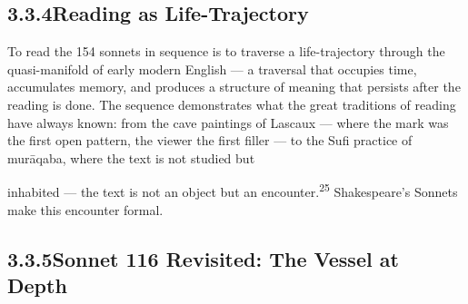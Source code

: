 \subsection{3.3.4\quad Reading as Life-Trajectory}

To read the 154 sonnets in sequence is to traverse a life-trajectory through the quasi-manifold of early modern English — a traversal that occupies time, accumulates memory, and produces a structure of meaning that persists after the reading is done. The sequence demonstrates what the great traditions of reading have always known: from the cave paintings of Lascaux — where the mark was the first open pattern, the viewer the first filler — to the Sufi practice of murāqaba, where the text is not studied but

inhabited — the text is not an object but an encounter.\textsuperscript{25} Shakespeare’s Sonnets make this encounter formal.

\subsection{3.3.5\quad Sonnet 116 Revisited: The Vessel at Depth}

